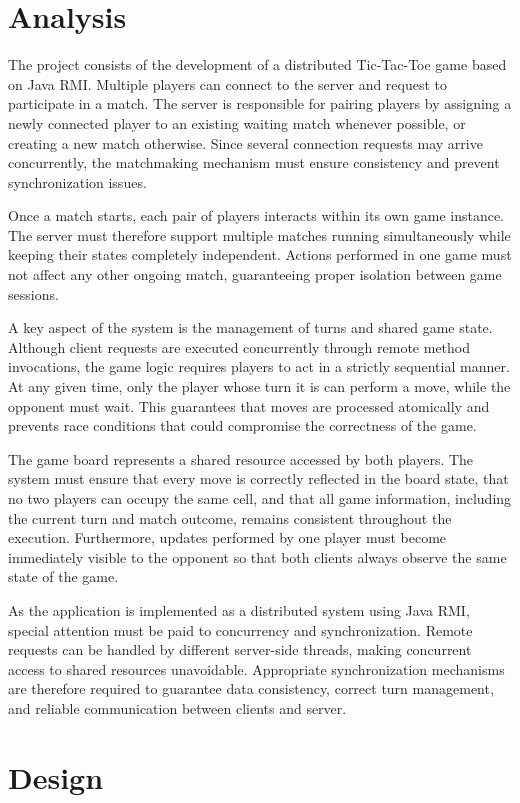 \documentclass{scrartcl}
\begin{document}
    \section{Analysis}

The project consists of the development of a distributed Tic-Tac-Toe game based on Java RMI. Multiple players can connect to the server and request to participate in a match. The server is responsible for pairing players by assigning a newly connected player to an existing waiting match whenever possible, or creating a new match otherwise. Since several connection requests may arrive concurrently, the matchmaking mechanism must ensure consistency and prevent synchronization issues.

Once a match starts, each pair of players interacts within its own game instance. The server must therefore support multiple matches running simultaneously while keeping their states completely independent. Actions performed in one game must not affect any other ongoing match, guaranteeing proper isolation between game sessions.

A key aspect of the system is the management of turns and shared game state. Although client requests are executed concurrently through remote method invocations, the game logic requires players to act in a strictly sequential manner. At any given time, only the player whose turn it is can perform a move, while the opponent must wait. This guarantees that moves are processed atomically and prevents race conditions that could compromise the correctness of the game.

The game board represents a shared resource accessed by both players. The system must ensure that every move is correctly reflected in the board state, that no two players can occupy the same cell, and that all game information, including the current turn and match outcome, remains consistent throughout the execution. Furthermore, updates performed by one player must become immediately visible to the opponent so that both clients always observe the same state of the game.

As the application is implemented as a distributed system using Java RMI, special attention must be paid to concurrency and synchronization. Remote requests can be handled by different server-side threads, making concurrent access to shared resources unavoidable. Appropriate synchronization mechanisms are therefore required to guarantee data consistency, correct turn management, and reliable communication between clients and server.
  \section{Design}
\end{document}
